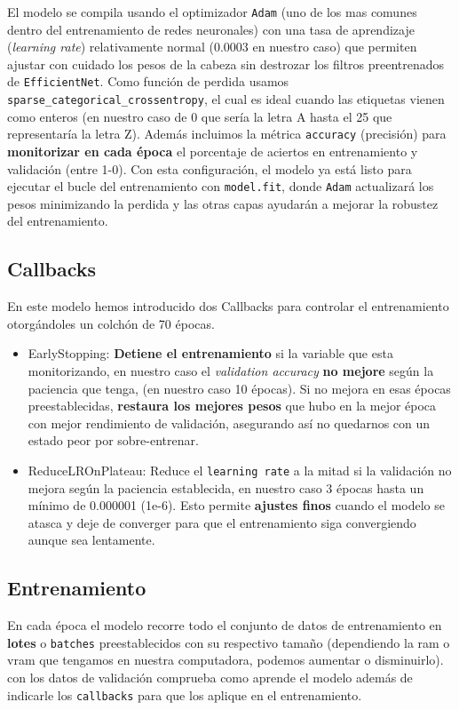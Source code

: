 El modelo se compila usando el optimizador \texttt{Adam} (uno de los mas comunes dentro del entrenamiento de redes neuronales) con una tasa de aprendizaje (\textit{learning rate}) relativamente normal (0.0003 en nuestro caso) que permiten ajustar con cuidado los pesos de la cabeza sin destrozar los filtros preentrenados de \texttt{EfficientNet}. Como función de perdida usamos \texttt{sparse\_categorical\_crossentropy}, el cual es ideal cuando las etiquetas vienen como enteros (en nuestro caso de 0 que sería la letra A hasta el 25 que representaría la letra Z). Además incluimos la métrica \texttt{accuracy} (precisión) para \textbf{monitorizar en cada época} el porcentaje de aciertos en entrenamiento y validación (entre 1-0). Con esta configuración, el modelo ya está listo para ejecutar el bucle del entrenamiento con \texttt{model.fit}, donde \texttt{Adam} actualizará los pesos minimizando la perdida y las otras capas ayudarán a mejorar la robustez del entrenamiento.

\subsection{Callbacks}
En este modelo hemos introducido dos Callbacks para controlar el entrenamiento otorgándoles un colchón de 70 épocas.

\begin{itemize}
    \item EarlyStopping: \textbf{Detiene el entrenamiento} si la variable que esta monitorizando, en nuestro caso el \textit{validation accuracy} \textbf{no mejore} según la paciencia que tenga, (en nuestro caso 10 épocas). Si no mejora en esas épocas preestablecidas, \textbf{restaura los mejores pesos} que hubo en la mejor época con mejor rendimiento de validación, asegurando así no quedarnos con un estado peor por sobre-entrenar.

    \item ReduceLROnPlateau: Reduce el \texttt{learning rate} a la mitad si la validación no mejora según la paciencia establecida, en nuestro caso 3 épocas hasta un mínimo de 0.000001 (1e-6). Esto permite \textbf{ajustes finos} cuando el modelo se atasca y deje de converger para que el entrenamiento siga convergiendo aunque sea lentamente.  
\end{itemize}

\subsection{Entrenamiento}
En cada época el modelo recorre todo el conjunto de datos de entrenamiento en \textbf{lotes} o \texttt{batches} preestablecidos con su respectivo tamaño (dependiendo la ram o vram que tengamos en nuestra computadora, podemos aumentar o disminuirlo). con los datos de validación comprueba como aprende el modelo además de indicarle los \texttt{callbacks} para que los aplique en el entrenamiento.

